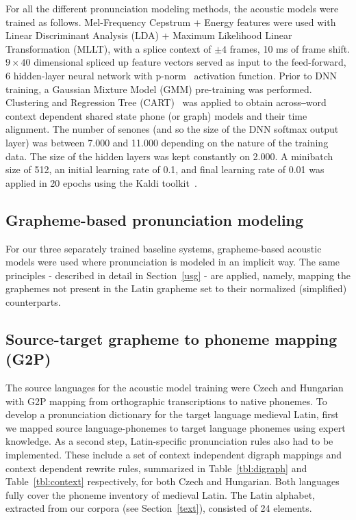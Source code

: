 \documentclass[runningheads,a4paper]{llncs}
\begin{document}
For all the different pronunciation modeling methods, the acoustic models were trained as follows.
Mel-Frequency Cepstrum $+$ Energy features were used with Linear Discriminant Analysis (LDA) + Maximum Likelihood Linear Transformation (MLLT), with a splice context of $\pm4$ frames, 10 ms of frame shift.
$9\times40$ dimensional spliced up feature vectors served as input to the feed-forward, 6 hidden-layer neural network with p-norm~\cite{kaldi} activation function.
Prior to DNN training, a Gaussian Mixture Model (GMM) pre-training was performed.
Clustering and Regression Tree (CART)~\cite{kaldi} was applied to obtain across‒word context dependent shared state phone (or graph) models and their time alignment.
The number of senones (and so the size of the DNN softmax output layer) was between 7.000 and 11.000 depending on the nature of the training data.
The size of the hidden layers was kept constantly on 2.000.
A minibatch size of 512, an initial learning rate of 0.1, and final learning rate of 0.01 was applied in 20 epochs using the Kaldi toolkit~\cite{kaldi}.

\subsection{Grapheme-based pronunciation modeling}\label{baseline}
For our three separately trained baseline systems, grapheme-based acoustic models were used where pronunciation is modeled in an implicit way.
The same principles - described in detail in Section~\ref{usg} - are applied, namely, mapping the graphemes not present in the Latin grapheme set to their normalized (simplified) counterparts.

\subsection{Source-target grapheme to phoneme mapping (G2P)}\label{g2p}
The source languages for the acoustic model training were Czech and Hungarian with G2P mapping from orthographic transcriptions to native phonemes.
To develop a pronunciation dictionary for the target language medieval Latin, first we mapped source language-phonemes to target language phonemes using expert knowledge.
As a second step, Latin-specific pronunciation rules also had to be implemented.
These include a set of context independent digraph mappings and context dependent rewrite rules, summarized in Table~\ref{tbl:digraph} and Table~\ref{tbl:context} respectively, for both Czech and Hungarian.
Both languages fully cover the phoneme inventory of medieval Latin.
The Latin alphabet, extracted from our corpora (see Section~\ref{text}), consisted of 24 elements.
\end{document}
